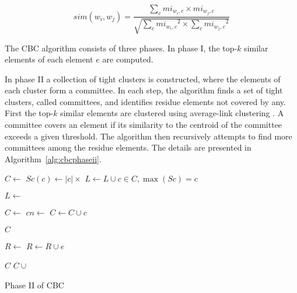 \begin{equation}
 sim(w_i,w_j) = \frac{\sum_c mi_{w_i,c} \times mi_{w_j,c}}
                     {\sqrt{\sum_c{mi_{w_i,c}}^2 \times \sum_c{mi_{w_j,c}}^2}}
 \label{eq:simwiwj}
\end{equation}

The \ac{CBC} algorithm consists of three phases. In phase I, the top-$k$
similar elements of each element $e$ are computed.

In phase II a collection of tight clusters is constructed, where the
elements of each cluster form a committee. In each step, the algorithm finds a
set of tight clusters, called committees, and identifies residue elements not
covered by any. First the top-$k$ similar elements are clustered using
average-link clustering \cite{han2000data}. A committee covers an element if
its similarity to the centroid of the committee exceeds a given threshold. The
algorithm then recursively attempts to find more committees among the residue
elements. The details are presented in Algorithm~\ref{alg:cbcphaseii}.

\begin{algorithm}
 \begin{algorithmic}
    \State $C \gets$ 
      \State $Sc(c) \gets |c| \times $ 
    \EndFor
    \State $L \gets L \cup c \in C, \max(Sc) = c$
  \EndFor

  \State $L \gets$ 

  \State $C \gets$ 
    \State $cn \gets$ 
      \State $C \gets C \cup c$
    \EndIf
  \EndFor

    \State \Return $C$
  \EndIf

  \State $R \gets$ 
      \State $R \gets R \cup e$
    \EndIf
  \EndFor

    \State \Return $C$
  \Else
    \State \Return $C \cup$ 
  \EndIf
\EndFunction
 \end{algorithmic}

 \caption{\label{alg:cbcphaseii} Phase II of CBC}
\end{algorithm}



